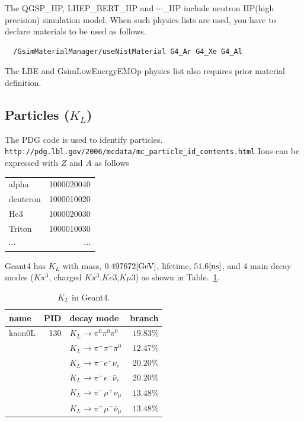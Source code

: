 \documentclass[a4paper,12pt]{article}
\begin{document}
 The QGSP\_HP, LHEP\_BERT\_HP and $\cdots$\_HP include 
 neutron HP(high precision)  simulation model. When such physics lists
 are used, you have to declare materials to be used as follows.
 \begin{screen}
  \begin{verbatim}
  /GsimMaterialManager/useNistMaterial G4_Ar G4_Xe G4_Al\end{verbatim}
 \end{screen}
 The LBE and GsimLowEnergyEMOp physics list also requires prior material
 definition. 
 
 \subsection{Particles ($K_L$)}
 The PDG code is used to identify particles.
 {\tt http://pdg.lbl.gov/2006/mcdata/mc\_particle\_id\_contents.html}
 Ions can be expressed with $Z$ and $A$ as follows
 \begin{table}[H]
  \begin{tabular}{l|r}
   alpha    & 1000020040\\
   deuteron & 1000010020\\
   He3      & 1000020030\\
   Triton   & 1000010030\\
   $\cdots$&$\cdots$
  \end{tabular}
 \end{table}

	
 Geant4 has $K_L$ with mass, $0.497672 [{\rm GeV}]$, lifetime,
 $51.6 [{\rm ns}]$, and 4 main decay modes ($K\pi^3$, charged
 $K\pi^3$,$Ke3$,$K\mu3$) as shown in Table.~\ref{tab:g4KL}. 
 \begin{table}[H]
  \caption{$K_L$ in Geant4.\label{tab:g4KL}}
  \begin{tabular}{l|rlr}
   name&PID &decay mode&branch \\\hline
   kaon0L&130 &$K_L\to\pi^0\pi^0\pi^0$&$19.83\%$\\
   &&$K_L\to\pi^+\pi^-\pi^0$&$12.47\%$\\
   &&$K_L\to\pi^-e^+\nu_e$&$20.20\%$\\
   &&$K_L\to\pi^+e^-\bar\nu_e$&$20.20\%$\\
   &&$K_L\to\pi^-\mu^+\nu_\mu$&$13.48\%$\\
   &&$K_L\to\pi^+\mu^-\bar\nu_\mu$&$13.48\%$\\
  \end{tabular}
 \end{table}
\end{document}
